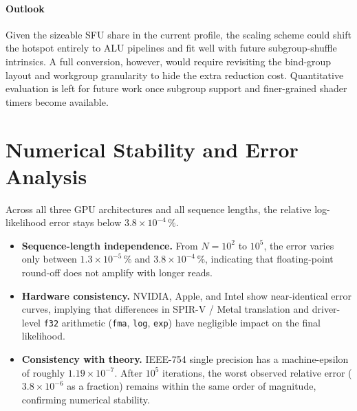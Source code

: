 \documentclass[PhD]{PHlab-thesis}
\begin{document}
\paragraph{Outlook}
Given the sizeable SFU share in the current profile, the scaling scheme could shift the hotspot entirely to ALU pipelines and fit well with future subgroup-shuffle intrinsics.  
A full conversion, however, would require revisiting the bind-group layout and workgroup granularity to hide the extra reduction cost.  
Quantitative evaluation is left for future work once subgroup support and finer-grained shader timers become available.

\section{Numerical Stability and Error Analysis}
Across all three GPU architectures and all sequence lengths, the relative log-likelihood error stays below $3.8\times10^{-4}\,\%$.
\begin{itemize}
  \item \textbf{Sequence-length independence.} From $N=10^{2}$ to $10^{5}$, the error varies only between $1.3\times10^{-5}\,\%$ and $3.8\times10^{-4}\,\%$, indicating that floating-point round-off does not amplify with longer reads.
  \item \textbf{Hardware consistency.} NVIDIA, Apple, and Intel show near-identical error curves, implying that differences in SPIR-V / Metal translation and driver-level \texttt{f32} arithmetic (\texttt{fma}, \texttt{log}, \texttt{exp}) have negligible impact on the final likelihood.
  \item \textbf{Consistency with theory.} IEEE-754 single precision has a machine-epsilon of roughly $1.19\times10^{-7}$. After $10^{5}$ iterations, the worst observed relative error ($3.8\times10^{-6}$ as a fraction) remains within the same order of magnitude, confirming numerical stability.
\end{itemize}
\end{document}
